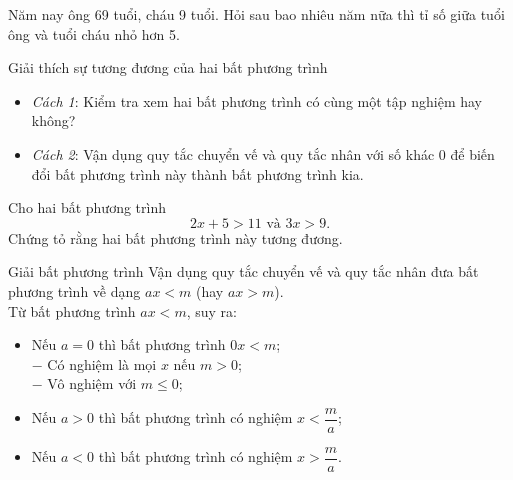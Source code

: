 \begin{vd}%
	Năm nay ông 69 tuổi, cháu 9 tuổi. Hỏi sau bao nhiêu năm nữa thì tỉ số giữa tuổi ông và tuổi cháu nhỏ hơn 5.
\end{vd}
\begin{dang}{Giải thích sự tương đương của hai bất phương trình}
	\begin{itemize}
		\item \textit{Cách 1}: Kiểm tra xem hai bất phương trình có cùng một tập nghiệm hay không?
		\item \textit{Cách 2}: Vận dụng quy tắc chuyển vế và quy tắc nhân với số khác $0$ để biến  đổi bất phương trình này thành bất phương trình kia.
	\end{itemize}
\end{dang}
\begin{vd}%
	Cho hai bất phương trình
	$$2x+5>11\text{ và } 3x>9.$$
	Chứng tỏ rằng hai bất phương trình này tương đương.
\end{vd}
\begin{dang}{Giải bất phương trình}
	Vận dụng quy tắc chuyển vế  và quy tắc nhân đưa bất phương trình về dạng $ax<m$ (hay $ax>m$).\\
	Từ bất phương trình $ax<m$, suy ra:
	\begin{itemize}
		\item Nếu $a=0$ thì bất phương trình $0x<m$;\\
		$-$ Có nghiệm là mọi $x$ nếu $m>0$;\\
		$-$ Vô nghiệm với $m\leq 0$;
		\item Nếu $a>0$ thì bất phương trình có nghiệm $x<\dfrac{m}{a}$;
		\item Nếu $a<0$ thì bất phương trình có nghiệm $x>\dfrac{m}{a}$.
	\end{itemize}
	\end{dang}
